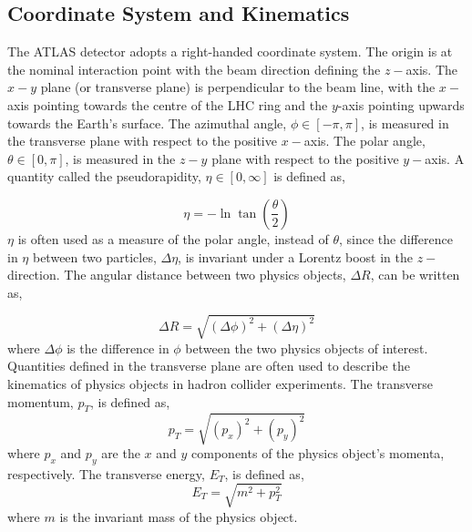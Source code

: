 \subsection{Coordinate System and Kinematics}

The ATLAS detector adopts a right-handed coordinate system. The origin is at the nominal interaction point with the beam direction defining the $z-$axis. The $x-y$ plane (or transverse plane) is perpendicular to the beam line, with the $x-$axis pointing towards the centre of the LHC ring and the $y$-axis pointing upwards towards the Earth's surface. The azimuthal angle, $\phi \in [-\pi, \pi]$, is measured in the transverse plane with respect to the positive $x-$axis. The polar angle, $\theta \in [0,\pi]$, is measured in the $z-y$ plane with respect to the positive $y-$axis. A quantity called the pseudorapidity, $\eta \in [0,\infty]$ is defined as,

\begin{equation}
\eta = -\ln{\tan{\left(\frac{\theta}{2}\right)}}
\end{equation}
$\eta$ is often used as a measure of the polar angle, instead of $\theta$, since the difference in $\eta$ between two particles, $\Delta \eta$, is invariant under a Lorentz boost in the $z-$direction. The angular distance between two physics objects, $\Delta R$, can be written as,

\begin{equation}
\Delta R = \sqrt{(\Delta\phi)^{2} + (\Delta\eta)^{2}}
\end{equation}
where $\Delta\phi$ is the difference in $\phi$ between the two physics objects of interest. Quantities defined in the transverse plane are often used to describe the kinematics of physics objects in hadron collider experiments. The transverse momentum, $p_{T}$, is defined as,
\begin{equation}
p_{T}= \sqrt{(p_{x})^{2} + (p_{y})^{2}}
\end{equation}
where $p_{x}$ and $p_{y}$ are the $x$ and $y$ components of the physics object's momenta, respectively. The transverse energy, $E_{T}$, is defined as,
\begin{equation}
E_{T} = \sqrt{m^{2} + p_{T}^{2}}
\end{equation}
where $m$ is the invariant mass of the physics object. 



